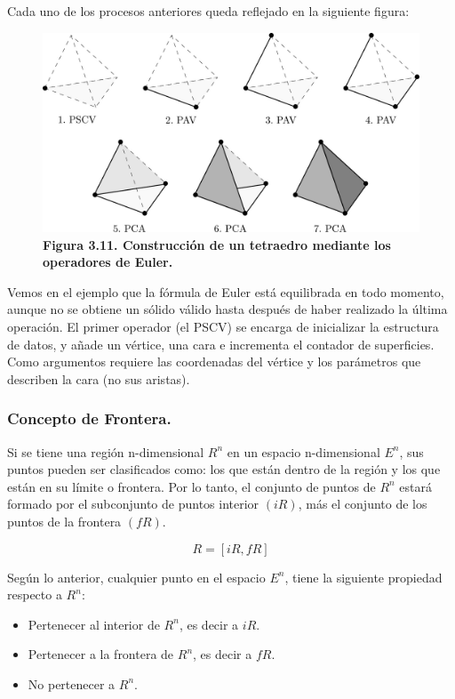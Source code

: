 Cada uno de los procesos anteriores queda reflejado en la siguiente figura:
\begin{figure}[h]
\includegraphics[width=12cm]{Img/GEO/geo-euler5.jpg}
\centering
\caption{\textbf{Figura 3.11. \footnotesize{Construcción de un tetraedro mediante los operadores de Euler.}}}
\end{figure}

Vemos en el ejemplo que la fórmula de Euler está equilibrada en todo momento, aunque no se obtiene un sólido válido hasta después de haber realizado la última operación. El primer operador (el PSCV) se encarga de inicializar la estructura de datos, y añade un vértice, una cara e incrementa el contador de superficies. Como argumentos requiere las coordenadas del vértice y los parámetros que describen la cara (no sus aristas).




\subsubsection{ Concepto de Frontera. }

Si se tiene una región n-dimensional $R^n$ en un espacio n-dimensional $E^n$, sus puntos pueden ser clasificados como: los que están dentro de la región y
los que están en su límite o frontera. Por lo tanto, el conjunto de puntos de $R^n$ estará formado por el subconjunto de puntos interior $(iR)$, más el conjunto de los puntos de la frontera $(fR)$.

$$R = [iR, fR]$$

Según lo anterior, cualquier punto en el espacio $E^n$, tiene la siguiente propiedad respecto a $R^n$:

\begin{itemize}
\item Pertenecer al interior de $R^n$, es decir a $iR$. 
\item Pertenecer a la frontera de $R^n$, es decir a $fR$.
\item No pertenecer a $R^n$. 
\end{itemize}


